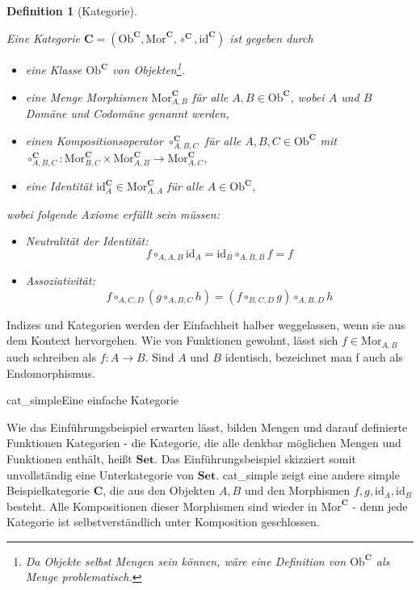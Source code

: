 \documentclass[11pt, a4paper, bibgerm]{book}
\newcommand\abb{}
\newcommand\fig{}
\newcommand\ato{\rightarrow} %
\newtheorem{defini}{Definition}
\newcommand{\defi}[2]{%
  \begin{defini}[#1]
    \label{def:#1}
    #2
  \end{defini}
}
\begin{document}
\defi{Kategorie}{
Eine Kategorie $\mathbf{C} = (\mathrm{Ob}^\mathbf{C}, \mathrm{Mor}^\mathbf{C},
\circ^\mathbf{C}, \mathrm{id}^\mathbf{C})$ ist gegeben durch
\begin{itemize}
\item eine Klasse $\mathrm{Ob}^\mathbf{C}$ von Objekten\footnote{Da Objekte selbst Mengen
    sein können, wäre eine Definition von $\mathrm{Ob}^\mathbf{C}$ als Menge problematisch.}.
\item eine Menge Morphismen $\mathrm{Mor}^\mathbf{C}_{A,B}$ für alle $ A,B \in
  \mathrm{Ob}^\mathbf{C}$, wobei $A$ und $B$ Domäne und Codomäne genannt werden,
\item einen Kompositionsoperator $\circ^\mathbf{C}_{A,B,C}$ für alle $
  A,B,C \in \mathrm{Ob}^\mathbf{C}$ mit \\
  $\circ^\mathbf{C}_{A,B,C} : \mathrm{Mor}^\mathbf{C}_{B,C} \times
  \mathrm{Mor}^\mathbf{C}_{A,B} \rightarrow \mathrm{Mor}^\mathbf{C}_{A,C}$,
\item eine Identität $\mathrm{id}^\mathbf{C}_A \in \mathrm{Mor}^\mathbf{C}_{A,A}$ für alle $ A \in \mathrm{Ob}^\mathbf{C}$,
\end{itemize}
wobei folgende Axiome erfüllt sein müssen:
\begin{itemize}
\item Neutralität der Identität: $$f \circ_{A,A,B} \mathrm{id}_A = \mathrm{id}_B \circ_{A,B,B} f = f$$
\item Assoziativität:
  $$f \circ_{A,C,D} (g \circ_{A,B,C} h) = (f \circ_{B,C,D} g) \circ_{A,B,D}h$$
\end{itemize}
}

Indizes und Kategorien werden der Einfachheit halber weggelassen, wenn
sie aus dem Kontext hervorgehen. Wie von Funktionen gewohnt, lässt sich
$f \in \mathrm{Mor}_{A,B}$ auch schreiben als $f : A \ato B$. Sind $A$
und $B$ identisch, bezeichnet man f auch als Endomorphismus.

\fig{cat_simple}{Eine einfache Kategorie}

Wie das Einführungsbeispiel erwarten lässt, bilden Mengen und darauf
definierte Funktionen Kategorien - die Kategorie, die alle denkbar
möglichen Mengen und Funktionen enthält, heißt $\mathbf{Set}$. Das
Einführungsbeispiel skizziert somit unvollständig eine Unterkategorie
von $\mathbf{Set}$. \abb{cat_simple} zeigt eine andere simple
Beispielkategorie $\mathbf{C}$, die aus den Objekten $A, B$ und den
Morphismen $f, g, \mathrm{id}_A, \mathrm{id}_B$ besteht. Alle
Kompositionen dieser Morphismen sind wieder in
$\mathrm{Mor}^{\mathbf{C}}$ - denn jede Kategorie ist selbstverständlich
unter Komposition geschlossen.
\end{document}

